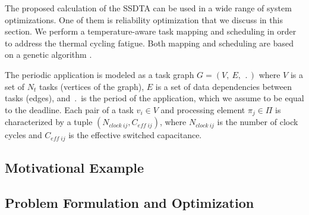 The proposed calculation of the SSDTA can be used in a wide range of system optimizations. One of them is reliability optimization that we discuss in this section. We perform a temperature-aware task mapping and scheduling in order to address the thermal cycling fatigue. Both mapping and scheduling are based on a genetic algorithm \cite{schmitz2004}.

 \label{sec:application-model}
The periodic application is modeled as a task graph $G = (V, \: E, \: \period)$ where $V$ is a set of $N_t$ tasks (vertices of the graph), $E$ is a set of data dependencies between tasks (edges), and $\period$ is the period of the application, which we assume to be equal to the deadline. Each pair of a task $v_i \in V$ and processing element $\pi_j \in \Pi$ is characterized by a tuple $(N_{clock \: ij}, C_{eff \; ij})$, where $N_{clock \: ij}$ is the number of clock cycles and $C_{eff \; ij}$ is the effective switched capacitance.

 \label{sec:reliability-model}


\subsection{Motivational Example}


\subsection{Problem Formulation and Optimization} \label{sec:reliability-problem}

